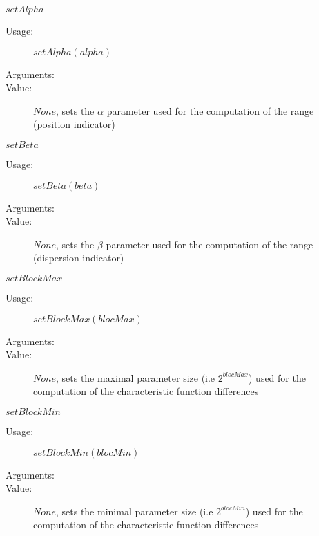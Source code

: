 \begin{description}
\begin{description}
  \item $setAlpha$
    \begin{description}
    \item[Usage:]  $setAlpha(alpha)$
    \item[Arguments:]  \strut
    \item[Value:]  $None$, sets the $\alpha$ parameter used for the computation of the range (position indicator)
    \end{description}

  \item $setBeta$
    \begin{description}
    \item[Usage:] $setBeta(beta)$
    \item[Arguments:] \strut
    \item[Value:] $None$, sets the $\beta$ parameter used for the computation of the range (dispersion indicator)
    \end{description}

  \item $setBlockMax$
    \begin{description}
    \item[Usage:]  $setBlockMax(blocMax)$
    \item[Arguments:]  \strut
    \item[Value:] $None$, sets the maximal parameter size (i.e $2^{blocMax}$) used for the computation of the characteristic function differences
    \end{description}

  \item $setBlockMin$
    \begin{description}
    \item[Usage:]  $setBlockMin(blocMin)$
    \item[Arguments:]  \strut
    \item[Value:] $None$, sets the minimal parameter size (i.e $2^{blocMin}$) used for the computation of the characteristic function differences
    \end{description}


\end{description}
\end{description}
